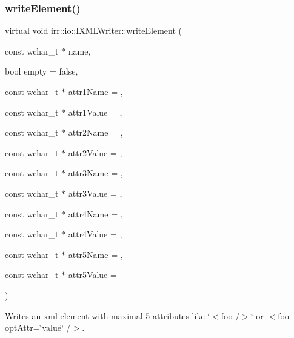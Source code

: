 \subsubsection{\texorpdfstring{write\+Element()}{writeElement()}\hspace{0.1cm}{\footnotesize\ttfamily [2/2]}}
{\footnotesize\ttfamily virtual void irr\+::io\+::\+I\+X\+M\+L\+Writer\+::write\+Element (\begin{DoxyParamCaption}\item[{const wchar\+\_\+t $\ast$}]{name,  }\item[{bool}]{empty = {\ttfamily false},  }\item[{const wchar\+\_\+t $\ast$}]{attr1\+Name = {},  }\item[{const wchar\+\_\+t $\ast$}]{attr1\+Value = {},  }\item[{const wchar\+\_\+t $\ast$}]{attr2\+Name = {},  }\item[{const wchar\+\_\+t $\ast$}]{attr2\+Value = {},  }\item[{const wchar\+\_\+t $\ast$}]{attr3\+Name = {},  }\item[{const wchar\+\_\+t $\ast$}]{attr3\+Value = {},  }\item[{const wchar\+\_\+t $\ast$}]{attr4\+Name = {},  }\item[{const wchar\+\_\+t $\ast$}]{attr4\+Value = {},  }\item[{const wchar\+\_\+t $\ast$}]{attr5\+Name = {},  }\item[{const wchar\+\_\+t $\ast$}]{attr5\+Value = {} }\end{DoxyParamCaption})\hspace{0.3cm}{\ttfamily [pure virtual]}}



Writes an xml element with maximal 5 attributes like \char`\"{}$<$foo /$>$\char`\"{} or $<$foo opt\+Attr=\char`\"{}value\char`\"{} /$>$. 

